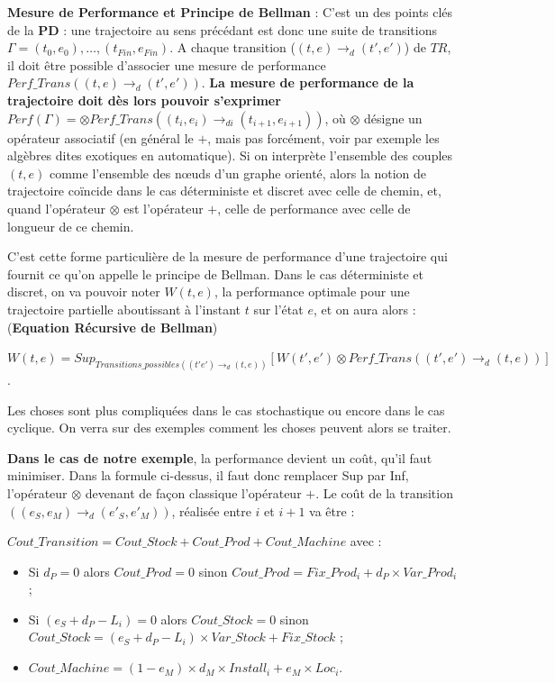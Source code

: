 \textbf{Mesure de Performance et Principe de Bellman} : C'est un des points clés de la \textbf{PD} : une trajectoire au sens précédant est donc une suite de transitions $\Gamma = {(t_0, e_0), \dots, (t_{Fin}, e_{Fin})}$. %
 A chaque transition ($(t, e) \rightarrow_d (t', e')$) de $TR$, il doit être possible d'associer une mesure de performance $Perf\_Trans((t, e) \rightarrow_d (t', e'))$. \textbf{La mesure de performance de la trajectoire doit dès lors pouvoir s'exprimer} $Perf(\Gamma) = \otimes Perf\_Trans((t_i, e_i) \rightarrow_{di} (t_{i+1}, e_{i+1}))$, où $\otimes$ désigne un opérateur associatif (en général le $+$, mais pas forcément, voir par exemple les algèbres dites exotiques en automatique). 
 Si on interprète l'ensemble des couples $(t, e)$ comme l'ensemble des nœuds d'un graphe orienté, alors la notion de trajectoire coïncide dans le cas déterministe et discret avec celle de chemin, et, quand l'opérateur $\otimes$ est l'opérateur $+$, celle de performance avec celle de longueur de ce chemin. 

C'est cette forme particulière de la mesure de performance d'une trajectoire qui fournit ce qu'on appelle le principe de Bellman. Dans le cas déterministe et discret, on va pouvoir noter $W(t, e)$, la performance optimale pour une trajectoire partielle aboutissant à l'instant $t$ sur l'état $e$,  et on aura alors : (\textbf{Equation Récursive de Bellman})

$W(t, e) = Sup_{Transitions\_possibles ((t' e') \rightarrow_{d} (t, e))}   [W(t', e') \otimes Perf\_Trans((t', e') \rightarrow_{d} (t, e))]$.

Les choses sont plus compliquées dans le cas stochastique ou encore dans le cas cyclique. On verra sur des exemples comment les choses peuvent alors se traiter. 

\textbf{Dans le cas de notre exemple}, la performance devient un coût, qu'il faut minimiser. Dans la formule ci-dessus, il faut donc remplacer Sup par Inf, l'opérateur $\otimes$ devenant de façon classique l'opérateur $+$. Le coût de la transition $((e_S, e_M) \rightarrow_{d} (e'_S, e'_M))$, réalisée entre $i$ et $i+1$ va être :
 
$Cout\_Transition = Cout\_Stock + Cout\_Prod + Cout\_Machine$ avec : 

\begin{itemize}[label=$\square$]
	\item	Si $d_P = 0$ alors $Cout\_Prod = 0$ sinon $Cout\_Prod  = Fix\_Prod_i + d_P \times Var\_Prod_i$ ; 
	\item	Si $(e_S + d_P - L_i ) = 0$ alors $Cout\_Stock = 0$ sinon  $Cout\_Stock = (e_S + d_P - L_i ) \times Var\_Stock +  Fix\_Stock$ ; 
	\item	$Cout\_Machine = (1 - e_M) \times d_M \times Install_i  + e_M \times Loc_i$.
\end{itemize} 

